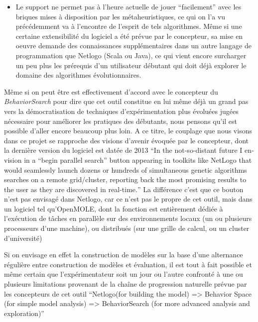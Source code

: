 \begin{itemize}
\item Le support ne permet pas à l'heure actuelle de jouer \enquote{facilement} avec les briques mises à disposition par les métaheuristiques, ce qui on l'a vu précédemment va à l'encontre de l'esprit de tels algorithmes. Même si une certaine extensibilité du logiciel a été prévue par le concepteur, sa mise en oeuvre demande des connaissances supplémentaires dans un autre langage de programmation que Netlogo (Scala ou Java), ce qui vient encore surcharger un peu plus les prérequis d'un utilisateur débutant qui doit déjà explorer le domaine des algorithmes évolutionnaires.
\end{itemize}

Même si on peut être est effectivement d'accord avec le concepteur du \textit{BehaviorSearch} pour dire que cet outil constitue en lui même déjà un grand pas vers la démocratisation de techniques d'expérimentation plus évoluées jugées nécessaire pour améliorer les pratiques des débutants, nous pensons qu'il est possible d'aller encore beaucoup plus loin. A ce titre, le couplage que nous visons dans ce projet se rapproche des visions d'avenir évoquée par le concepteur, dont la dernière version du logiciel est datée de 2013 \textcite[295]{Stonedahl2011a} \foreignquote{english}{In the not-so-distant future I envision in a “begin parallel search” button appearing in toolkits like NetLogo that would seamlessly launch dozens or hundreds of simultaneous genetic algorithms searches on a remote grid/cluster, reporting back the most promising results to the user as they are discovered in real-time.} La différence c'est que ce bouton n'est pas envisagé dans Netlogo, car ce n'est pas le propre de cet outil, mais dans un logiciel tel qu'OpenMOLE, dont la fonction est entièrement dédiée à l'exécution de tâches en parallèle sur des environnements locaux (un ou plusieurs processeurs d'une machine), ou distribués (sur une grille de calcul, ou un cluster d'université)

Si on envisage en effet la construction de modèles sur la base d'une alternance régulière entre construction de modèles et évaluation, il est tout à fait possible et même certain que l'expérimentateur soit un jour ou l'autre confronté à une ou plusieurs limitations provenant de la chaîne de progression naturelle prévue par les concepteurs de cet outil \foreignquote{english}{Netlogo(for building the model) => Behavior Space (for simple model analysis) => BehaviorSearch (for more advanced analysis and exploration)} \autocite[340]{Stonedahl2011a} 

